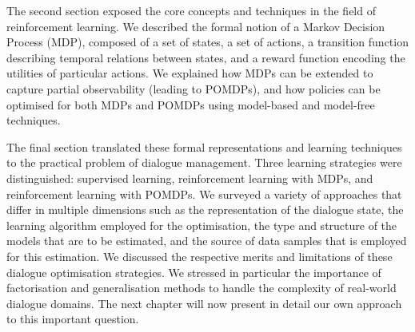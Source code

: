 The second section exposed the core concepts and techniques in the field of reinforcement learning.  We described the formal notion of a Markov Decision Process (MDP), composed of a set of states, a set of actions, a transition function describing temporal relations between states, and a reward function encoding the utilities of particular actions. We explained how MDPs can be extended to capture partial observability (leading to POMDPs), and how policies can be optimised for both MDPs and POMDPs using model-based and model-free techniques.

The final section translated these formal representations and learning techniques to the practical problem of dialogue management.  Three learning strategies were distinguished: supervised learning, reinforcement learning with MDPs, and reinforcement learning with POMDPs.  We surveyed a variety of approaches that differ in multiple dimensions such as the representation of the dialogue state, the learning algorithm employed for the optimisation, the type and structure of the models that are to be estimated, and the source of data samples that is employed for this estimation. We discussed the respective merits and limitations of these dialogue optimisation strategies.  We stressed in particular the importance of factorisation and generalisation methods to handle the complexity of real-world dialogue domains.  The next chapter will now present in detail our own approach to this important question.

